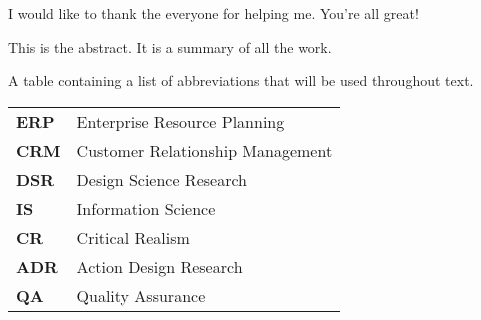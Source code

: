 \documentclass[a4paper,oneside,11pt]{book}
\begin{document}
\CoSupervisor{} 
\AssistantSupervisor{} 

\MakeTitle 

\begin{Acknowledgements}{}
			I would like to thank the everyone for helping me. You're all great!
\end{Acknowledgements}

\begin{Abstract}{}
			This is the abstract. It is a summary of all the work.
\end{Abstract}

\MakeTOCandLOFandLOT %

\begin{TableOfAbbrev}
			A table containing a list of abbreviations that will be used throughout text.
			\begin{table}[!htpb!]%
			\begin{tabular}{ll}
			\textbf{ERP} & Enterprise Resource Planning\\
                \textbf{CRM} & Customer Relationship Management\\
                \textbf{DSR} & Design Science Research\\
                \textbf{IS} & Information Science\\
                \textbf{CR} & Critical Realism\\
                \textbf{ADR} & Action Design Research\\
				\textbf{QA} & Quality Assurance\\
			\end{tabular}
			\end{table}
\end{TableOfAbbrev}
\end{document}
